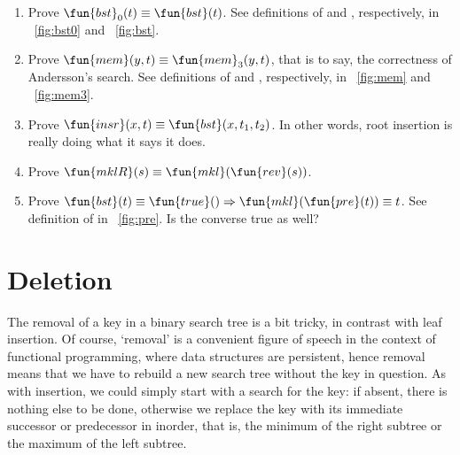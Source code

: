 \begin{enumerate}

  \item Prove \(\fun{bst}_0(t) \equiv \fun{bst}(t)\). See definitions of
   and
  , respectively, in
  \fig~\vref{fig:bst0} and \fig~\vref{fig:bst}.

  \item Prove \(\fun{mem}(y,t) \equiv \fun{mem}_3(y,t)\), that is to
  say, the correctness of Andersson's search. See definitions of
   and
  , respectively, in
  \fig~\vref{fig:mem} and \fig~\vref{fig:mem3}.

  \item Prove \(\fun{insr}(x,t) \equiv \fun{bst}(x,t_1,t_2)\).
   In
    other words, root insertion is really doing what it says it does.

  \item Prove \(\fun{mklR}(s) \equiv \fun{mkl}(\fun{rev}(s))\).
     

  \item Prove \(\fun{bst}(t) \equiv \fun{true}() \Rightarrow
    \fun{mkl}(\fun{pre}(t)) \equiv t\). See definition of 
     in \fig~\vref{fig:pre}. Is the converse
    true as well?

\end{enumerate}

\section{Deletion}

The removal of a key in a binary search tree is a bit tricky, in
contrast with leaf insertion. Of course, `removal' is a convenient
figure of speech in the context of functional programming, where data
structures are persistent, hence removal means that we have to rebuild
a new search tree without the key in question. As with insertion, we
could simply start with a search for the key: if absent, there is
nothing else to be done, otherwise we replace the key with its
immediate successor or predecessor in inorder, that is, the minimum of
the right subtree or the maximum of the left subtree.

